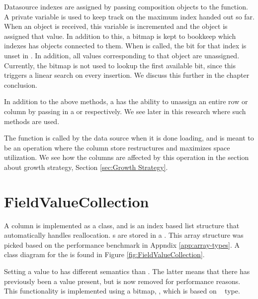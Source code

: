 Datasource indexes are assigned by passing composition objects to the   function. A private variable  is used to keep track on the maximum index handed out so far. When an object is received, this variable is incremented and the object is assigned that value. In addition to this, a bitmap  is kept to bookkeep which indexes has objects connected to them. When  is called, the bit for that index is unset in . In addition, all values corresponding to that object are unassigned. Currently, the  bitmap is not used to lookup the first available bit, since this triggers a linear search on every insertion. We discuss this further in the chapter conclusion.

In addition to the above methods, a  has the ability to unassign an entire row or column by passing in a  or  respectively. We see later in this research where such methods are used.

The  function is called by the data source when it is done loading, and is meant to be an operation where the column store restructures and maximizes space utilization. We see how the columns are affected by this operation in the section about growth strategy, Section \ref{sec:Growth Strategy}.


\section{FieldValueCollection}
\label{sec:FieldValueCollection}
A column is implemented as a  class, and is an index based list structure that automatically handles reallocation. s are stored in a . This array structure was picked based on the performance benchmark in Appndix \ref{app:array-types}. A class diagram for the  is found in Figure \ref{fig:FieldValueCollection}.

Setting a value to  has different semantics than . The latter means that there has previously been a value present, but is now removed for performance reasons. This functionality is implemented using a bitmap, , which is based on \delphi~ type. 

